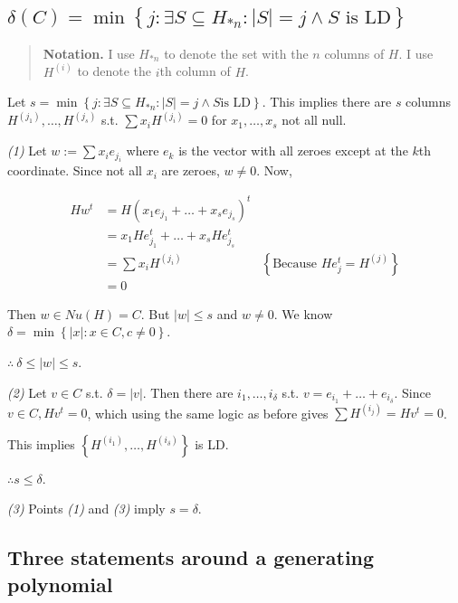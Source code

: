 \subsection{$\delta(C) = \min \left\{ j : \exists S \subseteq H_{*n} : |S| = j \land  S \text{ is LD} \right\} $}

\begin{quote}
    \textbf{Notation.} I use $H_{*n}$ to denote the set with the $n$ columns
    of $H$. I use $H^{(i)}$ to denote the $i$th column of $H$.
\end{quote}

Let $s = \min \left\{ j : \exists S \subseteq H_{*n} : |S| = j \land  S \text{
is LD} \right\} $. This implies there are $s$ columns $H^{(j_1)}, \ldots,
H^{(j_s)}$ s.t. $\sum x_i H^{( j_i )} = 0$ for $x_1, \ldots, x_s$ not all null.

\textit{(1)} Let $w := \sum x_i e_{j_i}$ where $e_{k}$ is the vector with all
zeroes except at the $k$th coordinate. Since not all $x_i$ are zeroes, $w \neq
0$. Now, 

\begin{align*}
    Hw^t &= H \left( x_1 e_{j_1} + \ldots + x_s e_{j_s} \right)^t \\ 
         &= x_1 H e_{j_1}^t + \ldots + x_s H e_{j_s}^t \\ 
         &= \sum x_i H^{(j_i)} &\left\{ \text{Because } He_j^t = H^{(j)} \right\}  \\ 
         &= 0
\end{align*}

Then $w \in Nu(H) = C$. But $|w| \leq s$ and $w \neq 0$. We know $\delta = \min
\left\{ |x| : x \in C, c \neq 0 \right\} $.

$\therefore ~ \delta \leq |w| \leq s$.

\textit{(2)} Let $v \in  C$ s.t. $\delta = |v|$. Then there are 
$i_1, \ldots, i_{\delta}$ s.t. $v = e_{i_1} + \ldots + e_{i_\delta}$.
Since $v \in  C, Hv^t = 0$, which using the same 
logic as before gives $\sum H^{(i_j)} = Hv^t = 0$.

This implies $\left\{ H^{(i_1)}, \ldots, H^{(i_{\delta})} \right\} $ is LD.

$\therefore  s \leq \delta$.

\textit{(3)} Points \textit{(1)} and \textit{(3)} imply $s = \delta$.

\pagebreak 

\subsection{Three statements around a generating polynomial}

